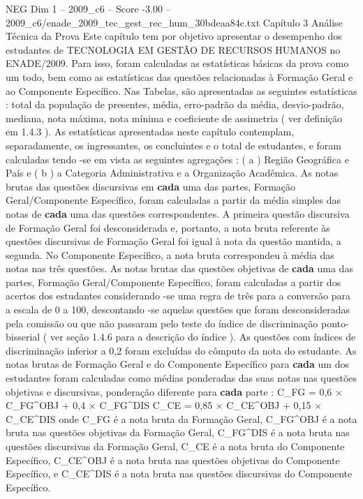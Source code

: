 \begin{textsample}{NEG Dim 1 – 2009\_c6 – Score -3.00 – 2009\_c6/enade\_2009\_tec\_gest\_rec\_hum\_30bdeaa84c.txt}  \label{ex:f1_neg_215}
Capítulo 3 Análise Técnica da Prova Este capítulo tem por objetivo apresentar o desempenho dos estudantes de TECNOLOGIA EM GESTÃO DE RECURSOS HUMANOS no ENADE/2009.
Para isso, foram calculadas as estatísticas básicas da prova como um todo, bem como as estatísticas das questões relacionadas à Formação Geral e ao Componente Específico.
Nas Tabelas, são apresentadas as seguintes estatísticas : total da população de presentes, média, erro-padrão da média, desvio-padrão, mediana, nota máxima, nota mínima e coeficiente de assimetria ( ver definição em 1.4.3 ).
As estatísticas apresentadas neste capítulo contemplam, separadamente, os ingressantes, os concluintes e o total de estudantes, e foram calculadas tendo -se em vista as seguintes agregações : ( a ) Região Geográfica e País e ( b ) a Categoria Administrativa e a Organização Acadêmica.
As notas brutas das questões discursivas em \textbf{cada} uma das partes, Formação Geral/Componente Específico, foram calculadas a partir da média simples das notas de \textbf{cada} uma das questões correspondentes.
A primeira questão discursiva de Formação Geral foi desconsiderada e, portanto, a nota bruta referente às questões discursivas de Formação Geral foi igual à nota da questão mantida, a segunda.
No Componente Específico, a nota bruta correspondeu à média das notas nas três questões.
As notas brutas das questões objetivas de \textbf{cada} uma das partes, Formação Geral/Componente Específico, foram calculadas a partir dos acertos dos estudantes considerando -se uma regra de três para a conversão para a escala de 0 a 100, descontando -se aquelas questões que foram desconsideradas pela comissão ou que não passaram pelo teste do índice de discriminação ponto-bisserial ( ver seção 1.4.6 para a descrição do índice ).
As questões com índices de discriminação inferior a 0,2 foram excluídas do cômputo da nota do estudante.
As notas brutas de Formação Geral e do Componente Específico para \textbf{cada} um dos estudantes foram calculadas como médias ponderadas das suas notas nas questões objetivas e discursivas, ponderação diferente para \textbf{cada} parte : C\_FG = 0,6 × C\_FG\textasciicircum{}OBJ + 0,4 × C\_FG\textasciicircum{}DIS C\_CE = 0,85 × C\_CE\textasciicircum{}OBJ + 0,15 × C\_CE\textasciicircum{}DIS onde C\_FG é a nota bruta da Formação Geral, C\_FG\textasciicircum{}OBJ é a nota bruta nas questões objetivas da Formação Geral, C\_FG\textasciicircum{}DIS é a nota bruta nas questões discursivas da Formação Geral, C\_CE é a nota bruta do Componente Específico, C\_CE\textasciicircum{}OBJ é a nota bruta nas questões objetivas do Componente Específico, e C\_CE\textasciicircum{}DIS é a nota bruta nas questões discursivas do Componente Específico.

\end{textsample}
